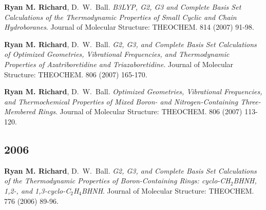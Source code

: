 \documentclass[11pt,a4paper,sans]{moderncv}
\begin{document}
\begin{etaremune}
	\item{\textbf{Ryan M. Richard}, D.~W.~Ball. {\em B3LYP, G2, G3 and Complete Basis Set Calculations of the Thermodynamic Properties of Small Cyclic and Chain Hydroboranes}.  Journal of Molecular Structure: THEOCHEM. 814 (2007) 91-98.}

	\item{\textbf{Ryan M. Richard}, D.~W.~Ball. {\em G2, G3, and Complete Basis Set Calculations of Optimized Geometries, Vibrational Frequencies, and Thermodynamic Properties of Azatriboretidine and Triazaboretidine}.  Journal of Molecular Structure: THEOCHEM.  806 (2007) 165-170.}

	\item{\textbf{Ryan M. Richard}, D.~W.~Ball.  {\em Optimized Geometries, Vibrational Frequencies, and Thermochemical Properties of Mixed Boron- and Nitrogen-Containing Three-Membered Rings}. Journal of Molecular Structure: THEOCHEM.  806 (2007) 113-120.}
	\subsection{2006}
	\item{\textbf{Ryan M. Richard}, D.~W.~Ball. {\em G2, G3, and Complete Basis Set Calculations of the Thermodynamic Properties of Boron-Containing Rings: cyclo-CH$_2$BHNH, 1,2-, and 1,3-cyclo-C$_2$H$_4$BHNH}. Journal of Molecular Structure: THEOCHEM.  776 (2006) 89-96. }
\end{etaremune}
\end{document}
